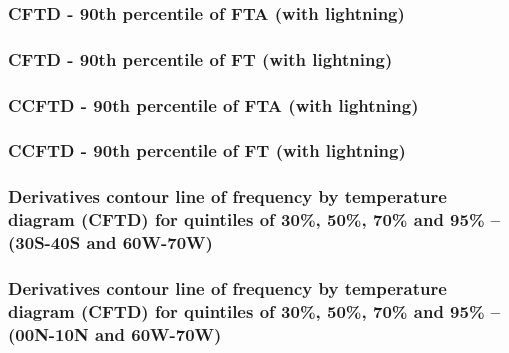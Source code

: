 \documentclass[smaller]{beamer}
\begin{document}





\begin{frame}
\frametitle{CFTD - 90th percentile of FTA (with lightning) }

\end{frame}
\begin{frame}
\frametitle{CFTD - 90th percentile of FT (with lightning) }

\end{frame}


\begin{frame}
\frametitle{CCFTD - 90th percentile of FTA (with lightning)}

\end{frame}
\begin{frame}
\frametitle{CCFTD - 90th percentile of FT (with lightning)}

\end{frame}

\begin{frame}
\frametitle{Derivatives contour line of frequency by temperature diagram (CFTD)  for quintiles of 30\%, 50\%, 70\% and 95\% -- (30S-40S and 60W-70W)}

\end{frame}

\begin{frame}
\frametitle{Derivatives contour line of frequency by temperature diagram (CFTD)  for quintiles of 30\%, 50\%, 70\% and 95\% -- (00N-10N and 60W-70W)}

\end{frame}
\end{document}
